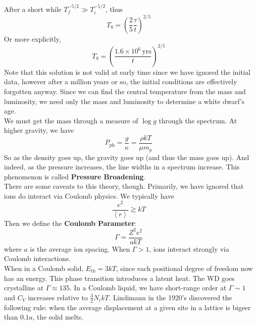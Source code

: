 \documentclass[10pt]{article}
\numberwithin{equation}{section}
\newcommand{\n}{\noindent}
\newcommand{\avg}[1]{\left\langle#1\right\rangle}
\begin{document}
    After a short while $T_f^{-5/2} \gg T_i^{-5/2}$, thus
    \begin{equation}
      \label{eq:302}
      T_8=\left(\frac{2}{5}\frac{\tau}{t}\right)^{2/5}
    \end{equation}
    Or more explicitly,
    \begin{equation}
      \label{eq:303}
      T_8=\left(\frac{1.6\times 10^6\,\mathrm{yrs}}{t}\right)^{2/5}
    \end{equation}
    Note that this solution is not valid at early time since we have
    ignored the initial data, however after a million years or so, the
    initial conditions are effectively forgotten anyway. Since we can
    find the central temperature from the mass and luminosity, we need
    only the mass and luminosity to determine a white dwarf's age.\\

    \n We must get the mass through a measure of $\log g$ through the
    spectrum. At higher gravity, we have
    \begin{equation}
      P_{\mathrm{ph}}=\frac{g}{\kappa}=\frac{\rho kT}{\mu m_p}\label{eq:
304}
    \end{equation}
    So as the density goes up, the gravity goes up (and thus the mass
    goes up). And indeed, as the
    pressure increases, the line widths in a spectrum increase. This
    phenomenon is called \textbf{Pressure Broadening}. \\

    \n There are some caveats to this theory, though. Primarily, we
    have ignored that ions do interact via Coulomb physics. We
    typically have 
    \begin{equation}
      \label{eq:305}
      \frac{e^2}{\avg{r}}\gtrsim kT
    \end{equation}
    Then we define the \textbf{Coulomb Parameter}:
    \begin{equation}
      \label{eq:306}
      \Gamma = \frac{Z^2 e^2}{a kT}
    \end{equation}
    where $a$ is the average ion spacing. When $\Gamma>1$, ions
    interact strongly via Coulomb interactions. \\

    \n When in a Coulomb solid, $E_{\mathrm{th}}=3kT$, since each
    positional degree of freedom now has an energy. This phase
    transition introduces a latent heat. The WD goes crystalline at
    $\Gamma\approx 135$. In a Coulomb liquid, we have short-range
    order at $\Gamma\sim1$ and $C_V$ increases relative to
    $\frac{3}{2}N_i kT$. Lindimann in the 1920's discovered the
    following rule: when the average displacement at a given site in a
    lattice is bigeer than $0.1a$, the solid melts.
    
\end{document}
